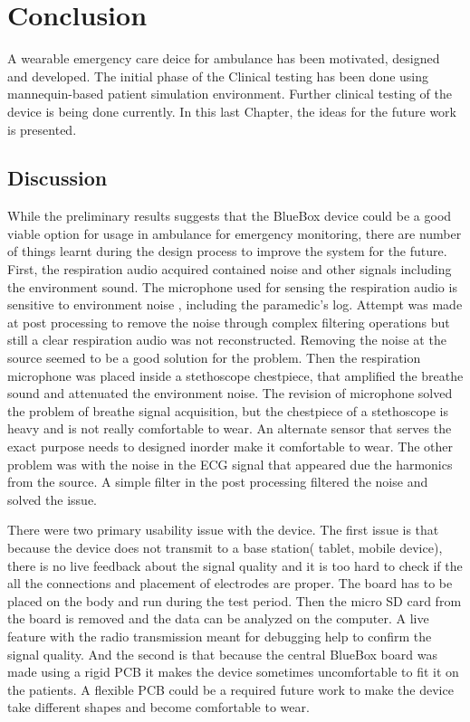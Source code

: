 \chapter{Conclusion}
A wearable emergency care deice for ambulance has been motivated, designed and developed. The initial phase of the Clinical testing has been done using mannequin-based patient simulation environment. Further clinical testing of the device is being done currently. In this last Chapter, the ideas for the future work is presented.  

\section{Discussion}
While the preliminary results suggests that the BlueBox device could be a good viable option for usage in ambulance for emergency monitoring, there are number of things learnt during the design process to improve the system for the future. First, the respiration audio acquired contained noise and other signals including the environment sound. The microphone used for sensing the respiration audio is sensitive to environment noise , including the paramedic's log. Attempt was made at post processing to remove the noise through complex filtering operations but still a clear respiration audio was not reconstructed. Removing the noise at the source seemed to be a good solution for the problem. Then the respiration microphone was placed inside a stethoscope chestpiece, that amplified the breathe sound and attenuated the environment noise. The revision of microphone solved the problem of breathe signal acquisition, but the chestpiece of a stethoscope is heavy and is not really comfortable to wear. An alternate sensor that serves the exact purpose needs to designed inorder make it comfortable to wear. The other problem was with the noise in the ECG signal that appeared due the harmonics from the source. A simple filter in the post processing filtered the noise and solved the issue. 

\hspace{10mm}There were two primary usability issue with the device. The first issue is that because the device does not transmit to a base station( tablet, mobile device), there is no live feedback about the signal quality and it is too hard to check if the all the connections and placement of electrodes are proper. The board has to be placed on the body and run during the test period. Then the micro SD card from the board is removed and the data can be analyzed on the computer. A live feature with the radio transmission meant for debugging help to confirm the signal quality. And the second is that because the central BlueBox board was made using a rigid PCB it makes the device sometimes uncomfortable to fit it on the patients. A flexible PCB could be a required future work to make the device take different shapes and become comfortable to wear. 

